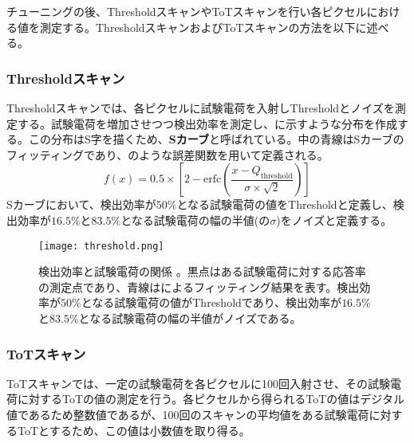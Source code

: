チューニングの後、ThresholdスキャンやToTスキャンを行い各ピクセルにおける値を測定する。ThresholdスキャンおよびToTスキャンの方法を以下に述べる。

\subsubsection{Thresholdスキャン}
\label{sec:thresholdscan}
Thresholdスキャンでは、各ピクセルに試験電荷を入射しThresholdとノイズを測定する。試験電荷を増加させつつ検出効率を測定し、に示すような分布を作成する。この分布はS字を描くため、\textbf{Sカーブ}と呼ばれている。中の青線はSカーブのフィッティングであり、のような誤差関数を用いて定義される。
\begin{equation}
  \label{eq:gosakannsuu}
  f(x)=0.5\times\left[ 2-\mathrm{erfc}\left( \frac{x-Q_\mathrm{threshold}}{\sigma \times \sqrt{2}} \right)  \right]
\end{equation}
Sカーブにおいて、検出効率が$50\%$となる試験電荷の値をThresholdと定義し、検出効率が$16.5\%$と$83.5\%$となる試験電荷の幅の半値(の$\sigma$)をノイズと定義する。

\begin{figure}[tbp]
  \centering
  \texttt{[image: threshold.png]}
  \caption[検出効率と試験電荷の関係]{検出効率と試験電荷の関係 \cite{calibnoise}。黒点はある試験電荷に対する応答率の測定点であり、青線はによるフィッティング結果を表す。検出効率が$50\%$となる試験電荷の値がThresholdであり、検出効率が$16.5\%$と$83.5\%$となる試験電荷の幅の半値がノイズである。}
  \label{fig:threshold}
\end{figure}


\subsubsection{ToTスキャン}
\label{sec:totscan}
ToTスキャンでは、一定の試験電荷を各ピクセルに100回入射させ、その試験電荷に対するToTの値の測定を行う。各ピクセルから得られるToTの値はデジタル値であるため整数値であるが、100回のスキャンの平均値をある試験電荷に対するToTとするため、この値は小数値を取り得る。


